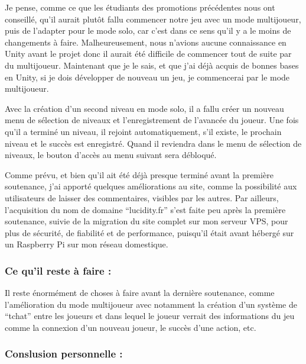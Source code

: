 \documentclass{article}
\begin{document}
Je pense, comme ce que les étudiants des promotions précédentes nous ont conseillé, qu’il aurait plutôt fallu commencer notre jeu avec un mode multijoueur, puis de l’adapter pour le mode solo, car c’est dans ce sens qu’il y a le moins de changements à faire. Malheureusement, nous n’avions aucune connaissance en Unity avant le projet donc il aurait été difficile de commencer tout de suite par du multijoueur. Maintenant que je le sais, et que j’ai déjà acquis de bonnes bases en Unity, si je dois développer de nouveau un jeu, je commencerai par le mode multijoueur.

Avec la création d’un second niveau en mode solo, il a fallu créer un nouveau menu de sélection de niveaux et l’enregistrement de l’avancée du joueur. Une fois qu’il a terminé un niveau, il rejoint automatiquement, s’il existe, le prochain niveau et le succès est enregistré. Quand il reviendra dans le menu de sélection de niveaux, le bouton d’accès au menu suivant sera débloqué.

Comme prévu, et bien qu’il ait été déjà presque terminé avant la première soutenance, j’ai apporté quelques améliorations au site, comme la possibilité aux utilisateurs de laisser des commentaires, visibles par les autres.
Par ailleurs, l’acquisition du nom de domaine “lucidity.fr” s’est faite peu après la première soutenance, suivie de la migration du site complet sur mon serveur VPS, pour plus de sécurité, de fiabilité et de performance, puisqu’il était avant hébergé sur un Raspberry Pi sur mon réseau domestique.


\quad

\quad

\newpage
		\subsubsection{Ce qu'il reste à faire :}

\quad

\quad


Il reste énormément de choses à faire avant la dernière soutenance, comme l’amélioration du mode multijoueur avec notamment la création d’un système de “tchat” entre les joueurs et dans lequel le joueur verrait des informations du jeu comme la connexion d’un nouveau joueur, le succès d’une action, etc.

\quad

\quad

		\subsubsection{Conslusion personnelle :}
\end{document}

